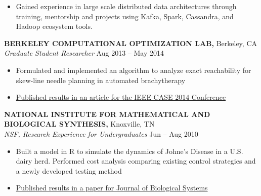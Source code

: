 \documentclass[geomargin]{res}
\begin{document}
\begin{resume}
\begin{itemize}
  \item Gained experience in large scale distributed data architectures through training,
    mentorship and projects using Kafka, Spark, Cassandra, and Hadoop ecosystem tools.
\end{itemize}
\vspace{-1mm}

{\bf BERKELEY COMPUTATIONAL OPTIMIZATION LAB,} Berkeley, CA \\
{\em Graduate Student Researcher} \hfill
Aug 2013 -- May 2014 \\                                          \vspace{-4mm}
\begin{itemize}                                         \itemsep1pt %
        \item    Formulated and implemented an algorithm to analyze exact reachability for skew-line needle planning in automated brachytherapy
        \item    \href{http://www.decf.berkeley.edu/~gyang/paper2014.pdf}{Published results in an article for the IEEE CASE 2014 Conference}
\end{itemize}
\vspace{-1mm}


{\bf NATIONAL INSTITUTE FOR MATHEMATICAL AND BIOLOGICAL SYNTHESIS,} Knoxville, TN \\
{\em NSF, Research Experience for Undergraduates}    \hfill
Jun -- Aug 2010 \\                                          \vspace{-4mm}
\begin{itemize}                                         \itemsep1pt 
        \item Built a model in R to simulate the dynamics of Johne's Disease in a U.S. dairy herd. Performed cost analysis comparing existing control strategies and a newly developed testing method
        \item \href{http://www.worldscientific.com/doi/abs/10.1142/S021833901340010X}{Published results in a paper for Journal of Biological Systems}
\end{itemize}
\vspace{-1mm}



\end{resume}
\end{document}
